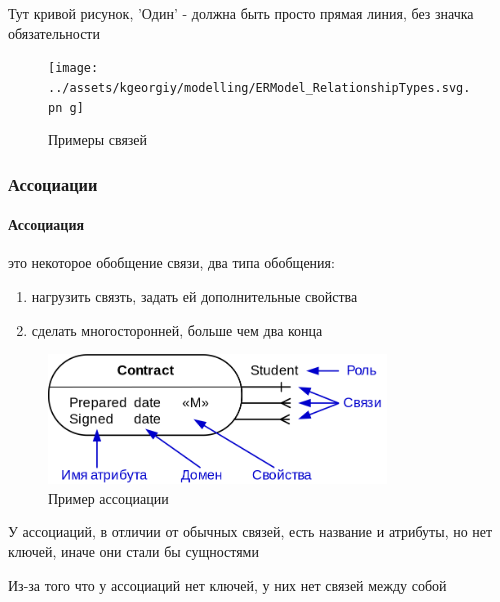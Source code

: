 \begin{remark}
	Тут кривой рисунок, 'Один' - должна быть просто прямая линия, без значка обязательности
\end{remark}


\begin{figure}[h]
	\centering

	\texttt{[image: ../assets/kgeorgiy/modelling/ERModel\_RelationshipTypes.svg.pn
		g]}
	\caption{Примеры связей}
\end{figure}

\subsubsection{Ассоциации}
\paragraph{Ассоциация} это некоторое обобщение связи, два типа обобщения:
\begin{enumerate}
	\item нагрузить связть, задать ей дополнительные свойства
	\item сделать многосторонней, больше чем два конца
\end{enumerate}

\begin{figure}[h]
	\centering

	\includegraphics[width=0.8\textwidth]{../assets/kgeorgiy/modelling/ERModel_Association.svg.png}
	\caption{Пример ассоциации}
\end{figure}

\begin{remark}
	У ассоциаций, в отличии от обычных связей, есть название и атрибуты, но нет ключей, иначе они стали бы сущностями
\end{remark}

\begin{remark}
	Из-за того что у ассоциаций нет ключей, у них нет связей между собой
\end{remark}

